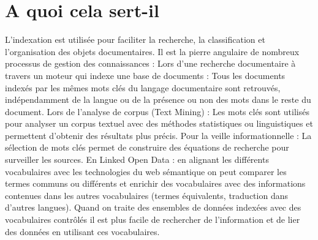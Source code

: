 \documentclass[12pt]{report}
\begin{document}
\section{A quoi cela sert-il}
L'indexation est utilisée pour faciliter la recherche, la classification et l'organisation des objets documentaires. Il est la pierre angulaire de nombreux processus de gestion des connaissances :
Lors d'une recherche documentaire à travers un moteur qui indexe une base de documents : Tous les documents indexés par les mêmes mots clés du langage documentaire sont retrouvés, indépendamment de la langue ou de la présence ou non des mots dans le reste du document.
Lors de l'analyse de corpus (Text Mining) : Les mots clés   sont utilisés pour analyser un corpus textuel avec des méthodes statistiques ou linguistiques et permettent d'obtenir des résultats plus précis.
Pour la veille informationnelle : La sélection de mots clés permet de construire des équations de recherche pour surveiller les sources.
En Linked Open Data : en alignant les différents vocabulaires avec les technologies du web sémantique on peut comparer les termes communs ou différents et enrichir des vocabulaires avec des informations contenues dans les autres vocabulaires (termes équivalents, traduction dans d'autres langues).   Quand   on traite des ensembles de données indexées avec des vocabulaires contrôlés il est plus facile de rechercher de l’information et de lier des données   en utilisant ces vocabulaires. \\
\\
\newpage
\end{document}
